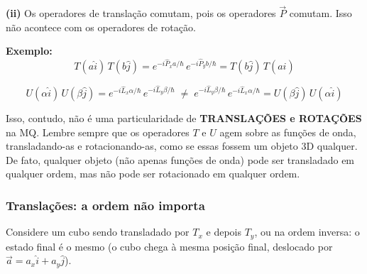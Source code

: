 \textbf{(ii)} Os operadores de translação comutam, pois os operadores $\vec{P}$ comutam. Isso não acontece com os operadores de rotação.

\textbf{Exemplo:}
\begin{equation}
    T(a\hat{i})\,T(b\hat{j}) = e^{-i\hat{P}_x a/\hbar}\,e^{-i\hat{P}_y b/\hbar} = T(b\hat{j})\,T(a\hat{i})
\label{eq:aula21_comutam_translacao}
\end{equation}

\begin{equation}
    U(\alpha\hat{i})\,U(\beta\hat{j}) = e^{-i\hat{L}_x\alpha/\hbar}\,e^{-i\hat{L}_y\beta/\hbar}
    \;\neq\;
    e^{-i\hat{L}_y\beta/\hbar}\,e^{-i\hat{L}_x\alpha/\hbar}
    = U(\beta\hat{j})\,U(\alpha\hat{i})
\label{eq:aula21_nao_comutam_rotacao}
\end{equation}

Isso, contudo, não é uma particularidade de \textbf{TRANSLAÇÕES e ROTAÇÕES} na MQ. Lembre sempre que os operadores $T$ e $U$ agem sobre as funções de onda, transladando-as e rotacionando-as, como se essas fossem um objeto 3D qualquer. De fato, qualquer objeto (não apenas funções de onda) pode ser transladado em qualquer ordem, mas não pode ser rotacionado em qualquer ordem.

\subsubsection*{Translações: a ordem não importa}

Considere um cubo sendo transladado por $T_x$ e depois $T_y$, ou na ordem inversa: o estado final é o mesmo (o cubo chega à mesma posição final, deslocado por $\vec{a} = a_x\hat{i} + a_y\hat{j}$).

\begin{center}
\end{center}

